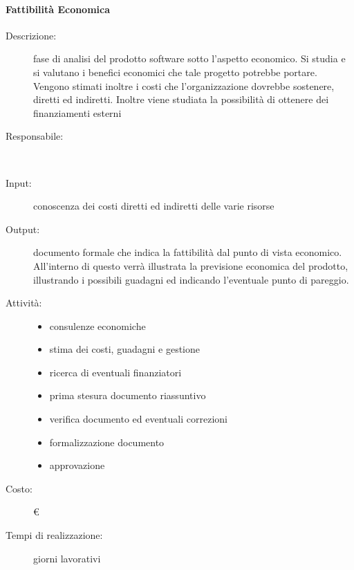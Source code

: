 \paragraph{Fattibilità Economica}
\begin{description}
\item[Descrizione:] fase di analisi del prodotto software sotto l'aspetto economico. Si studia
e si valutano i benefici economici che tale progetto potrebbe portare. Vengono stimati
inoltre i costi che l'organizzazione dovrebbe sostenere, diretti ed indiretti. Inoltre viene
studiata la possibilità di ottenere dei finanziamenti esterni \\

\item[Responsabile:] \\

\item[Input:] conoscenza dei costi diretti ed indiretti delle varie risorse \\

\item[Output:] documento formale che indica la fattibilità dal punto di vista economico.
All'interno di questo verrà illustrata la previsione economica del prodotto, illustrando i
possibili guadagni ed indicando l'eventuale punto di pareggio.\\

\item[Attività:]
\begin{itemize}
\item consulenze economiche
\item stima dei costi, guadagni e gestione
\item ricerca di eventuali finanziatori
\item prima stesura documento riassuntivo
\item verifica documento ed eventuali correzioni
\item formalizzazione documento
\item approvazione
\end{itemize}
\item[Costo:] \euro \\
\item[Tempi di realizzazione:]  giorni lavorativi
\end{description}



